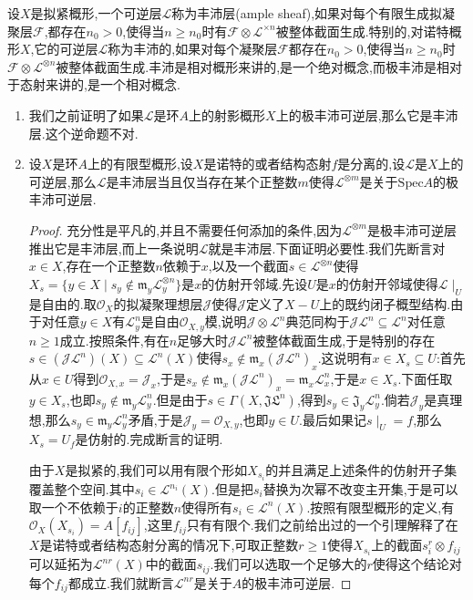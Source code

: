 设$X$是拟紧概形,一个可逆层$\mathscr{L}$称为丰沛层(ample sheaf),如果对每个有限生成拟凝聚层$\mathscr{F}$,都存在$n_0>0$,使得当$n\ge n_0$时有$\mathscr{F}\otimes\mathscr{L}^{\times n}$被整体截面生成.特别的,对诺特概形$X$,它的可逆层$\mathscr{L}$称为丰沛的,如果对每个凝聚层$\mathscr{F}$都存在$n_0>0$,使得当$n\ge n_0$时$\mathscr{F}\otimes\mathscr{L}^{\otimes n}$被整体截面生成.丰沛是相对概形来讲的,是一个绝对概念,而极丰沛是相对于态射来讲的,是一个相对概念.
\begin{enumerate}
	
	\item 我们之前证明了如果$\mathscr{L}$是环$A$上的射影概形$X$上的极丰沛可逆层,那么它是丰沛层.这个逆命题不对.
	
	\item 设$X$是环$A$上的有限型概形,设$X$是诺特的或者结构态射$f$是分离的,设$\mathscr{L}$是$X$上的可逆层,那么$\mathscr{L}$是丰沛层当且仅当存在某个正整数$m$使得$\mathscr{L}^{\otimes m}$是关于$\mathrm{Spec}A$的极丰沛可逆层.
	\begin{proof}
		
		充分性是平凡的,并且不需要任何添加的条件,因为$\mathscr{L}^{\otimes m}$是极丰沛可逆层推出它是丰沛层,而上一条说明$\mathscr{L}$就是丰沛层.下面证明必要性.我们先断言对$x\in X$,存在一个正整数$n$依赖于$x$,以及一个截面$s\in\mathscr{L}^{\otimes n}$使得$X_s=\{y\in X\mid s_y\not\in\mathfrak{m}_y\mathscr{L}_y^{\otimes n}\}$是$x$的仿射开邻域.先设$U$是$x$的仿射开邻域使得$\mathscr{L}\mid_U$是自由的.取$\mathscr{O}_X$的拟凝聚理想层$\mathscr{J}$使得$\mathscr{J}$定义了$X-U$上的既约闭子概型结构.由于对任意$y\in X$有$\mathscr{L}_y^n$是自由$\mathscr{O}_{X,y}$模,说明$\mathscr{J}\otimes\mathscr{L}^n$典范同构于$\mathscr{J}\mathscr{L}^n\subseteq\mathscr{L}^n$对任意$n\ge1$成立.按照条件,有在$n$足够大时$\mathscr{J}\mathscr{L}^n$被整体截面生成,于是特别的存在$s\in(\mathscr{J}\mathscr{L}^n)(X)\subseteq\mathscr{L}^n(X)$使得$s_x\not\in\mathfrak{m}_x(\mathscr{J}\mathscr{L}^n)_x$.这说明有$x\in X_s\subseteq U$:首先从$x\in U$得到$\mathscr{O}_{X,x}=\mathscr{J}_x$,于是$s_x\not\in\mathfrak{m}_x(\mathscr{J}\mathscr{L}^n)_x=\mathfrak{m}_x\mathscr{L}^n_x$,于是$x\in X_s$.下面任取$y\in X_s$,也即$s_y\not\in\mathfrak{m}_y\mathscr{L}_y^n$.但是由于$s\in\Gamma(X,\mathfrak{J}\mathfrak{L}^n)$,得到$s_y\in\mathfrak{J}_y\mathscr{L}_y^n$.倘若$\mathscr{J}_y$是真理想,那么$s_y\in\mathfrak{m}_y\mathscr{L}_y^n$矛盾,于是$\mathscr{J}_y=\mathscr{O}_{X,y}$,也即$y\in U$.最后如果记$s\mid_U=f$,那么$X_s=U_f$是仿射的.完成断言的证明.
		
		\qquad
		
		由于$X$是拟紧的,我们可以用有限个形如$X_{s_i}$的并且满足上述条件的仿射开子集覆盖整个空间.其中$s_i\in\mathscr{L}^{n_i}(X)$.但是把$s_i$替换为次幂不改变主开集,于是可以取一个不依赖于$i$的正整数$n$使得所有$s_i\in\mathscr{L}^n(X)$.按照有限型概形的定义,有$\mathscr{O}_X(X_{s_i})=A[f_{ij}]$,这里$f_{ij}$只有有限个.我们之前给出过的一个引理解释了在$X$是诺特或者结构态射分离的情况下,可取正整数$r\ge1$使得$X_{s_i}$上的截面$s_i^r\otimes f_{ij}$可以延拓为$\mathscr{L}^{nr}(X)$中的截面$s_{ij}$.我们可以选取一个足够大的$r$使得这个结论对每个$f_{ij}$都成立.我们就断言$\mathscr{L}^{nr}$是关于$A$的极丰沛可逆层.
		

\end{proof}
\end{enumerate}
